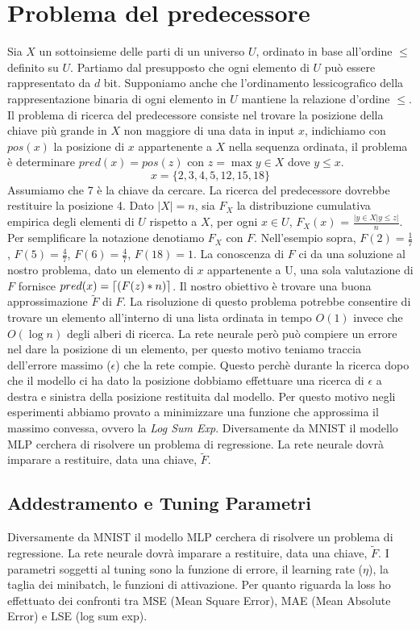 \documentclass[11pt,a4paper,twoside,
openright]{book}
\DeclarePairedDelimiter{\ceil}{\lceil}{\rceil}
\begin{document}
\section{Problema del predecessore}
Sia $X$ un sottoinsieme delle parti di un universo $U$, ordinato in base all'ordine $\leq$ definito su $U$. Partiamo dal presupposto che ogni elemento di $U$ può essere rappresentato da $d$ bit. Supponiamo anche che l'ordinamento lessicografico della rappresentazione binaria di ogni elemento in $U$ mantiene la relazione d'ordine $\leq$. Il problema di ricerca del predecessore consiste nel trovare la posizione della chiave più grande in $X$ non maggiore di una data in input $x$, indichiamo con $pos(x)$ la posizione di $x$ appartenente a $X$ nella sequenza ordinata, il problema è determinare $pred(x)=pos(z)$ con $z = \max y \in X$ dove $y \leq x$.
\begin{equation}
x=\{2,3,4,5,12,15,18\}
\tag{Esempio}
\end{equation}
Assumiamo che 7 è la chiave da cercare. La ricerca del predecessore dovrebbe restituire la posizione 4.
Dato $|X|=n$, sia $F_{X}$ la distribuzione cumulativa empirica degli elementi di $U$ rispetto a $X$, per ogni $x\in U$, $F_X(x)$ = ${\frac{|y \in X | y \leq z|}{n}}$. Per semplificare la notazione denotiamo $F_{X}$ con $F$. Nell'esempio sopra, $F(2)=\frac{1}{7}$, $F(5)=\frac{4}{7}$, $F(6)=\frac{4}{7}$, $F(18)=1$. La conoscenza di $F$ ci da una soluzione al nostro problema, dato un elemento di $x$ appartenente a U, una sola valutazione di $F$ fornisce $pred(x)=\ceil{(F(z)*n)}$. Il nostro obiettivo è trovare una buona approssimazione $\tilde{F}$  di $F$.
La risoluzione di questo problema potrebbe consentire di trovare un elemento all'interno di una lista ordinata in tempo $O(1)$ invece che $O(\log n)$ degli alberi di ricerca.
La rete neurale però può compiere un errore nel dare la posizione di un elemento, per questo motivo teniamo traccia dell'errore massimo ($\epsilon$) che la rete compie. Questo perchè durante la ricerca dopo che il modello ci ha dato la posizione dobbiamo effettuare una ricerca di $\epsilon$ a destra e sinistra della posizione restituita dal modello. Per questo motivo negli esperimenti abbiamo provato a minimizzare una funzione che approssima il massimo convessa, ovvero la \textit{Log Sum Exp}.
Diversamente da MNIST il modello MLP cerchera di risolvere un problema di regressione. La rete neurale dovrà imparare a restituire, data una chiave, $\tilde{F}$.

\subsection{Addestramento e Tuning Parametri}
Diversamente da MNIST il modello MLP cerchera di risolvere un problema di regressione. La rete neurale dovrà imparare a restituire, data una chiave, $\tilde{F}$.
I parametri soggetti al tuning sono la funzione di errore, il learning rate ($\eta$), la taglia dei minibatch, le funzioni di attivazione.
Per quanto riguarda la loss ho effettuato dei confronti tra MSE (Mean Square Error), MAE (Mean Absolute Error) e LSE (log sum exp). 
\end{document}
